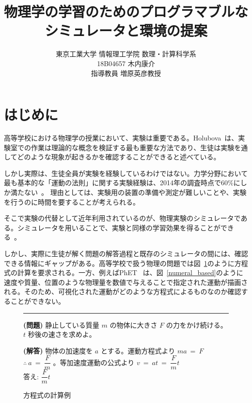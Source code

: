 \documentclass[11pt, a4paper, oneside, twocolumn, dvipdfmx]{jsarticle}
\title{物理学の学習のためのプログラマブルな
\\シミュレータと環境の提案}
\author{東京工業大学 情報理工学院 数理・計算科学系\\18B04657 木内康介\\指導教員 増原英彦教授}
\date{}
\begin{document}
\maketitle

\section{はじめに} \label{intro}
高等学校における物理学の授業において、実験は重要である。Holubova~\cite{holubova_2019}は、実験室での作業は理論的な概念を検証する最も重要な方法であり、生徒は実験を通してどのような現象が起きるかを確認することができると述べている。

しかし実際は、生徒全員が実験を経験しているわけではない。力学分野において最も基本的な「運動の法則」に関する実験経験は、2014年の調査時点で60\%にしか満たない~\cite{2015KJ00010038066}。
理由としては、実験用の装置の準備や測定が難しいことや、実験を行うのに時間を要することが考えられる。

そこで実験の代替として近年利用されているのが、物理実験のシミュレータである。シミュレータを用いることで、実験と同様の学習効果を得ることができる~\cite{ajredini_real_2014}。

しかし、実際に生徒が解く問題の解答過程と既存のシミュレータの間には、確認できる情報にギャップがある。高等学校で扱う物理の問題では図~\ref{symbol_based}のように方程式の計算を要求される。一方、例えばPhET~\cite{perkins_phet_2006} は、図~\ref{numeral_based}のように速度や質量、位置のような物理量を数値で与えることで指定された運動が描画される。そのため、可視化された運動がどのような方程式によるものなのか確認することができない。

\begin{figure}[b]

\noindent\rule{\linewidth}{0.4pt}

\small{\textbf{(問題)} 静止している質量 $m$ の物体に大きさ $F$ の力をかけ続ける。$t$ 秒後の速さを求めよ。}

\small{\textbf{(解答)} 物体の加速度を $a$ とする。運動方程式より $ma~=~F$ $\therefore~a~=~\dfrac{F}{m}$ 。等加速度運動の公式より $v~=~at~=~\dfrac{F}{m}t$\\
答え: $\dfrac{F}{m}t$}

\caption{方程式の計算例} \label{symbol_based}
\end{figure}
\end{document}
